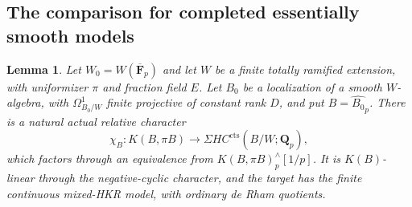 \documentclass[11pt,a4paper]{amsart}
\numberwithin{equation}{section}
\newtheorem{lemma}[theorem]{Lemma}
\theoremstyle{definition}
\theoremstyle{remark}
\begin{document}
\subsection{The comparison for completed essentially smooth models}

\begin{lemma}
\label{d3:lem:essentiallysmoothAMMN}
Let $W_0=W(\overline{\mathbf F}_p)$ and let $W$
be a finite totally ramified extension, with uniformizer $\pi$
and fraction field $E$. Let $B_0$ be a localization of a smooth
$W$-algebra, with $\Omega^1_{B_0/W}$ finite projective of constant
rank $D$, and put $B=\widehat{B_0}_p$.
There is a natural actual relative character
\[
 \chi_B:K(B,\pi B)\longrightarrow
                 \Sigma HC^{\mathrm{cts}}(B/W;\mathbf Q_p),
\]
which factors through an equivalence from
$K(B,\pi B)^{\wedge}_p[1/p]$. It is $K(B)$-linear through the negative-cyclic
character, and the target has the finite continuous mixed-HKR
model, with ordinary de Rham quotients.
\end{lemma}
\end{document}
